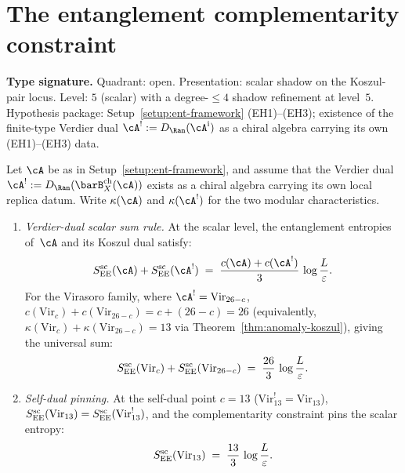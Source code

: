 %
%

\section{The entanglement complementarity constraint}
\label{sec:ent-complementarity}

\begin{theorem}
\label{thm:entanglement-complementarity}
\textbf{Type signature.}  Quadrant: open.  Presentation: scalar shadow
on the Koszul-pair locus.  Level: $5$ (scalar) with a degree-$\le4$
shadow refinement at level~$5$.  Hypothesis package: Setup~\ref{setup:ent-framework}
(EH1)--(EH3); existence of the finite-type Verdier dual
$\cA^!:=D_{\Ran}(\cA^{\mathrm i})$ as a chiral algebra carrying its own
(EH1)--(EH3) data.

Let $\cA$ be as in Setup~\textup{\ref{setup:ent-framework}}, and
assume that the Verdier dual
$\cA^!:=D_{\Ran}(\barB_X^{\mathrm{ch}}(\cA))$ exists as a chiral
algebra carrying its own local replica datum.  Write
$\kappa(\cA)$ and $\kappa(\cA^!)$ for the two modular
characteristics.
\begin{enumerate}[label=\textup{(\roman*)}]
\item \emph{Verdier-dual scalar sum rule.}
At the scalar level, the entanglement entropies of~$\cA$
and its Koszul dual satisfy:
\begin{equation}\label{eq:ent-complementarity-sum}
S_{\EE}^{\mathrm{sc}}(\cA)
+ S_{\EE}^{\mathrm{sc}}(\cA^!)
\;=\;
\frac{c(\cA) + c(\cA^!)}{3}\,
\log\frac{L}{\varepsilon}.
\end{equation}
For the Virasoro family, where $\cA^!=\mathrm{Vir}_{26-c}$,
$c(\mathrm{Vir}_c) + c(\mathrm{Vir}_{26-c}) = c + (26 - c) = 26$
\textup{(}equivalently,
$\kappa(\mathrm{Vir}_c) + \kappa(\mathrm{Vir}_{26-c}) = 13$
via Theorem~\textup{\ref{thm:anomaly-koszul}}\textup{)},
giving the universal sum:
\begin{equation}\label{eq:ent-virasoro-sum}
S_{\mathrm{EE}}^{\mathrm{sc}}(\mathrm{Vir}_c)
+ S_{\mathrm{EE}}^{\mathrm{sc}}(\mathrm{Vir}_{26-c})
\;=\;
\frac{26}{3}\,\log\frac{L}{\varepsilon}.
\end{equation}

\item \emph{Self-dual pinning.}
At the self-dual point $c = 13$
\textup{(}$\mathrm{Vir}_{13}^! = \mathrm{Vir}_{13}$\textup{)},
$S_{\mathrm{EE}}^{\mathrm{sc}}(\mathrm{Vir}_{13})
= S_{\mathrm{EE}}^{\mathrm{sc}}(\mathrm{Vir}_{13}^!)$, and the
complementarity constraint pins the scalar entropy:
\begin{equation}\label{eq:ent-self-dual}
S_{\mathrm{EE}}^{\mathrm{sc}}(\mathrm{Vir}_{13})
\;=\;
\frac{13}{3}\,\log\frac{L}{\varepsilon}.
\end{equation}


\end{enumerate}
\end{theorem}
